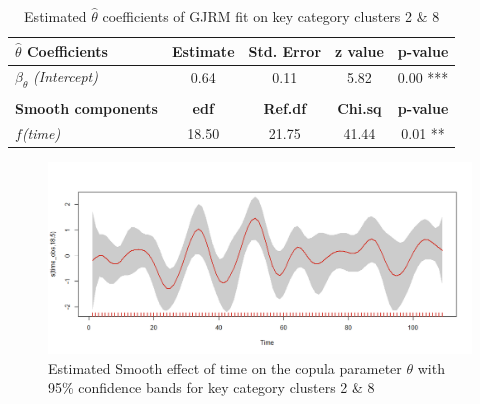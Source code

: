 \begin{table}[H]
\centering
\begin{tabular}{l|c|c|c|c}
\hline
                               \textbf{$\hat{\theta}$ Coefficients}       & \textbf{Estimate} & \textbf{Std. Error} & \textbf{z value} & \textbf{p-value}  \\ \hline\hline
$\beta_{\theta}$ \textit{(Intercept)}                  & 0.64     & 0.11       & 5.82    & 0.00 ***   \\ \hline
& & & & \\ \hline
\textbf{Smooth components}            & \textbf{edf}      & \textbf{Ref.df}     & \textbf{Chi.sq}  & \textbf{p-value}  \\ \hline\hline
\textit{$f$(time)}                 & 18.50    & 21.75      & 41.44   & 0.01 ** \\ \hline
\end{tabular}
\caption{Estimated $\hat{\theta}$ coefficients of \ac{GJRM} fit on key category clusters 2 \& 8}
\label{tab:theta_coeff_kcc_28}
\end{table}











\begin{figure}[H]
\centering
  \includegraphics[width=0.95\linewidth]{figures/time_effect_on_theta_28.png}
  \caption{Estimated Smooth effect of time on the copula parameter $\theta$ with 95\% confidence bands for key category clusters 2 \& 8}
  \label{fig:time_effect_on_theta_28}
\end{figure}





